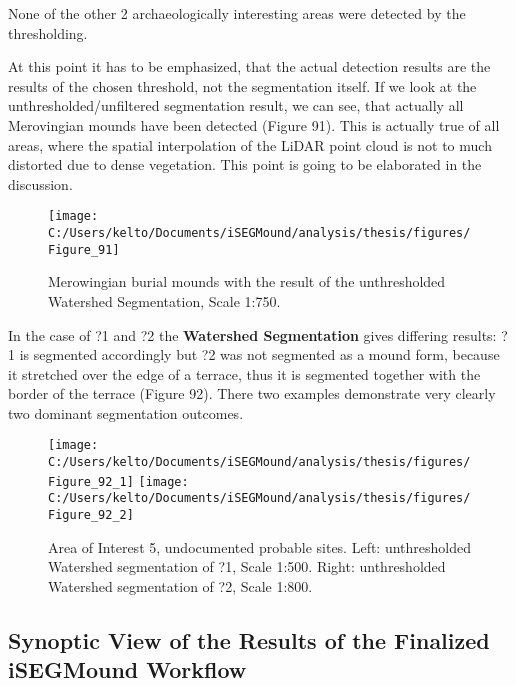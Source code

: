 \documentclass[
  12pt,
]{article}
\begin{document}
None of the other 2 archaeologically interesting areas were detected by the thresholding.

At this point it has to be emphasized, that the actual detection results are the results of the chosen threshold, not the segmentation itself. If we look at the unthresholded/unfiltered segmentation result, we can see, that actually all Merovingian mounds have been detected (Figure 91). This is actually true of all areas, where the spatial interpolation of the LiDAR point cloud is not to much distorted due to dense vegetation. This point is going to be elaborated in the discussion.

\begin{figure}

{\centering \texttt{[image: C:/Users/kelto/Documents/iSEGMound/analysis/thesis/figures/Figure\_91]} 

}

\caption{Merowingian burial mounds with the result of the unthresholded Watershed Segmentation, Scale 1:750.}\label{fig:Figure91}
\end{figure}

In the case of ?1 and ?2 the \textbf{Watershed Segmentation} gives differing results: ?1 is segmented accordingly but ?2 was not segmented as a mound form, because it stretched over the edge of a terrace, thus it is segmented together with the border of the terrace (Figure 92). There two examples demonstrate very clearly two dominant segmentation outcomes.

\begin{figure}
\texttt{[image: C:/Users/kelto/Documents/iSEGMound/analysis/thesis/figures/Figure\_92\_1]} \texttt{[image: C:/Users/kelto/Documents/iSEGMound/analysis/thesis/figures/Figure\_92\_2]} \caption{Area of Interest 5, undocumented probable sites. Left: unthresholded Watershed segmentation of ?1, Scale 1:500. Right: unthresholded Watershed segmentation of ?2, Scale 1:800.}\label{fig:Figure92}
\end{figure}

\hypertarget{synoptic-view-of-the-results-of-the-finalized-isegmound-workflow}{%
\subsection{\texorpdfstring{\textbf{Synoptic View of the Results of the Finalized iSEGMound Workflow}}{Synoptic View of the Results of the Finalized iSEGMound Workflow}}\label{synoptic-view-of-the-results-of-the-finalized-isegmound-workflow}}
\end{document}
